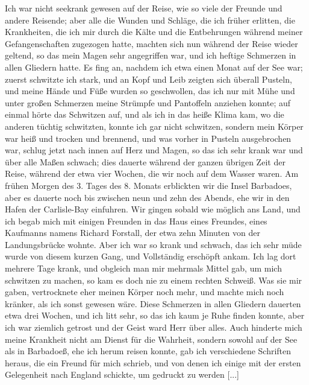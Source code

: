 Ich war nicht seekrank gewesen auf der Reise, wie so viele
der Freunde und andere Reisende; aber alle die Wunden und
Schläge, die ich früher erlitten, die Krankheiten, die ich mir durch
die Kälte und die Entbehrungen während meiner Gefangenschaften
zugezogen hatte, machten sich nun während der Reise wieder
geltend, so das mein Magen sehr angegriffen war, und ich heftige
Schmerzen in allen Gliedern hatte. Es fing an, nachdem ich
etwa einen Monat auf der See war; zuerst schwitzte ich stark,
und an Kopf und Leib zeigten sich überall Pusteln, und meine
Hände und Füße wurden so geschwollen, das ich nur mit Mühe
und unter großen Schmerzen meine Strümpfe und Pantoffeln
anziehen konnte; auf einmal hörte das Schwitzen auf, und
als ich in das heiße Klima kam, wo die anderen tüchtig schwitzten,
konnte ich gar nicht schwitzen, sondern mein Körper war heiß
und trocken und brennend, und was vorher in Pusteln 
ausgebrochen war, schlug jetzt nach innen auf Herz und Magen, so
das ich sehr krank war und über alle Maßen schwach; dies
dauerte während der ganzen übrigen Zeit der Reise, während
der etwa vier Wochen, die wir noch auf dem Wasser waren.
Am frühen Morgen des 3. Tages des 8. Monats erblickten wir
die Insel Barbadoes, aber es dauerte noch bis zwischen neun und
zehn des Abends, ehe wir in den Hafen der Carlisle-Bay 
einfuhren. Wir gingen sobald wie möglich ans Land, und ich 
begab mich mit einigen Freunden in das Haus eines Freundes,
eines Kaufmanns namens Richard Forstall, der etwa zehn
Minuten von der Landungsbrücke wohnte. Aber ich war so
krank und schwach, das ich sehr müde wurde von diesem kurzen
Gang, und Vollständig erschöpft ankam. Ich lag dort mehrere
Tage krank, und obgleich man mir mehrmals Mittel gab, um
mich schwitzen zu machen, so kam es doch nie zu einem rechten
Schweiß. Was sie mir gaben, vertrocknete eher meinen Körper
noch mehr, und machte mich noch kränker, als ich sonst gewesen
wäre. Diese Schmerzen in allen Gliedern dauerten etwa drei
Wochen, und ich litt sehr, so das ich kaum je Ruhe finden
konnte, aber ich war ziemlich getrost und der Geist ward Herr
über alles. Auch hinderte mich meine Krankheit nicht am Dienst
für die Wahrheit, sondern sowohl auf der See als in Barbadoeß,
ehe ich herum reisen konnte, gab ich verschiedene Schriften
heraus, die ein Freund für mich schrieb, und von denen ich einige
mit der ersten Gelegenheit nach England schickte, um gedruckt
zu werden [...]

